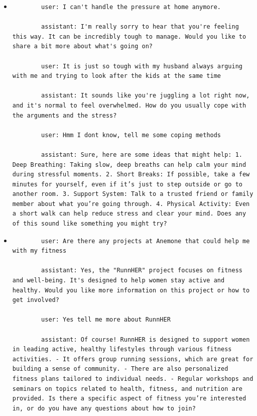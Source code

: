 \begin{itemize}
    \item
	\begin{verbatim}
        user: I can't handle the pressure at home anymore.
        
        assistant: I'm really sorry to hear that you're feeling this way. It can be incredibly tough to manage. Would you like to share a bit more about what's going on?

        user: It is just so tough with my husband always arguing with me and trying to look after the kids at the same time

        assistant: It sounds like you're juggling a lot right now, and it's normal to feel overwhelmed. How do you usually cope with the arguments and the stress?

        user: Hmm I dont know, tell me some coping methods

        assistant: Sure, here are some ideas that might help: 1. Deep Breathing: Taking slow, deep breaths can help calm your mind during stressful moments. 2. Short Breaks: If possible, take a few minutes for yourself, even if it’s just to step outside or go to another room. 3. Support System: Talk to a trusted friend or family member about what you’re going through. 4. Physical Activity: Even a short walk can help reduce stress and clear your mind. Does any of this sound like something you might try?
	\end{verbatim}

	\item 
	\begin{verbatim}
        user: Are there any projects at Anemone that could help me with my fitness

        assistant: Yes, the "RunnHER" project focuses on fitness and well-being. It's designed to help women stay active and healthy. Would you like more information on this project or how to get involved?
	
        user: Yes tell me more about RunnHER

        assistant: Of course! RunnHER is designed to support women in leading active, healthy lifestyles through various fitness activities. - It offers group running sessions, which are great for building a sense of community. - There are also personalized fitness plans tailored to individual needs. - Regular workshops and seminars on topics related to health, fitness, and nutrition are provided. Is there a specific aspect of fitness you’re interested in, or do you have any questions about how to join?
    

\end{verbatim}
\end{itemize}
